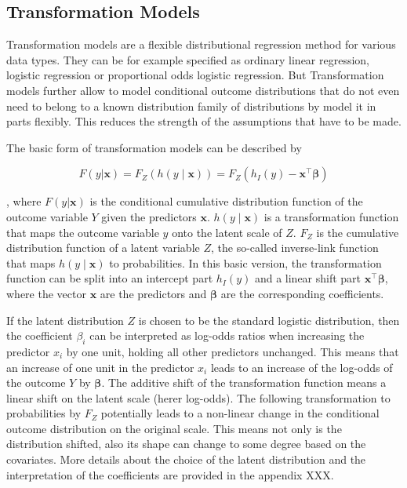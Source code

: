\subsection{Transformation Models}


Transformation models are a flexible distributional regression method for various data types. They can be for example specified as ordinary linear regression, logistic regression or proportional odds logistic regression. But Transformation models further allow to model conditional outcome distributions that do not even need to belong to a known distribution family of distributions by model it in parts flexibly. This reduces the strength of the assumptions that have to be made.

The basic form of transformation models can be described by

\begin{equation}
F(y|\mathbf{x}) = F_Z(h(y \mid \mathbf{x})) =  F_Z(h_I(y) - \mathbf{x}^\top \boldsymbol{\beta})
\label{eq:transformation_model}
\end{equation}

, where $F(y|\mathbf{x})$ is the conditional cumulative distribution function of the outcome variable $Y$ given the predictors $\mathbf{x}$. $h(y \mid \mathbf{x})$ is a transformation function that maps the outcome variable $y$ onto the latent scale of $Z$. $F_Z$ is the cumulative distribution function of a latent variable $Z$, the so-called inverse-link function that maps $h(y \mid \mathbf{x})$ to probabilities. In this basic version, the transformation function can be split into an intercept part $h_I(y)$ and a linear shift part $\mathbf{x}^\top \boldsymbol{\beta}$, where the vector $\mathbf{x}$ are the predictors and $\boldsymbol{\beta}$ are the corresponding coefficients.

If the latent distribution $Z$ is chosen to be the standard logistic distribution, then the coefficient $\beta_i$ can be interpreted as log-odds ratios when increasing the predictor $x_i$ by one unit, holding all other predictors unchanged. This means that an increase of one unit in the predictor $x_i$ leads to an increase of the log-odds of the outcome $Y$ by $\boldsymbol{\beta}$. The additive shift of the transformation function means a linear shift on the latent scale (herer log-odds). The following transformation to probabilities by $F_Z$ potentially leads to a non-linear change in the conditional outcome distribution on the original scale. This means not only is the distribution shifted, also its shape can change to some degree based on the covariates. More details about the choice of the latent distribution and the interpretation of the coefficients are provided in the appendix XXX.


